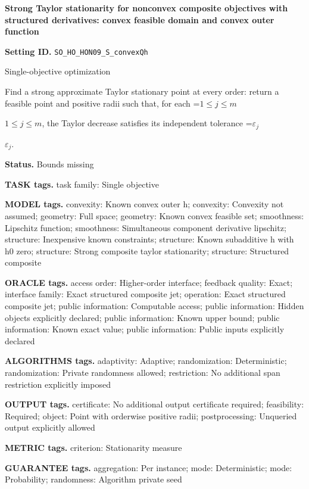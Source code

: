 \documentclass[10pt,a4paper]{article}
\newcommand{\AtlasMath}[1]{\par\begingroup\centering\setbox0=\hbox{$\displaystyle #1$}\ifdim\wd0>1.4\linewidth\typeout{ATLAS WIDE FORMULA: \the\wd0}\fi\ifdim\wd0>\linewidth\resizebox{\linewidth}{!}{\box0}\else\box0\fi\par\endgroup}
\newcommand{\AtlasInlineMath}[1]{\begingroup\setbox0=\hbox{$#1$}\ifdim\wd0>.4\linewidth\endgroup\AtlasMath{#1}\else\endgroup$#1$\fi}
\begin{document}
\raggedright

{\LARGE\bfseries\sffamily\color{AtlasNavy} Strong Taylor stationarity for nonconvex composite objectives with structured derivatives: convex feasible domain and convex outer function\par}\vspace{5pt}
\textbf{Setting ID.} \texttt{SO\_\allowbreak{}HO\_\allowbreak{}HON09\_\allowbreak{}S\_\allowbreak{}convexQh}

Single-objective optimization

Find a strong approximate Taylor stationary point at every order: return a feasible point and positive radii such that, for each \AtlasInlineMath{1\le j\le m}, the Taylor decrease satisfies its independent tolerance \AtlasInlineMath{\varepsilon_j}.

\textbf{Status.} Bounds missing

\textbf{TASK tags.} task family: Single objective

\textbf{MODEL tags.} convexity: Known convex outer h; convexity: Convexity not assumed; geometry: Full space; geometry: Known convex feasible set; smoothness: Lipschitz function; smoothness: Simultaneous component derivative lipschitz; structure: Inexpensive known constraints; structure: Known subadditive h with h0 zero; structure: Strong composite taylor stationarity; structure: Structured composite

\textbf{ORACLE tags.} access order: Higher-order interface; feedback quality: Exact; interface family: Exact structured composite jet; operation: Exact structured composite jet; public information: Computable access; public information: Hidden objects explicitly declared; public information: Known upper bound; public information: Known exact value; public information: Public inputs explicitly declared

\textbf{ALGORITHMS tags.} adaptivity: Adaptive; randomization: Deterministic; randomization: Private randomness allowed; restriction: No additional span restriction explicitly imposed

\textbf{OUTPUT tags.} certificate: No additional output certificate required; feasibility: Required; object: Point with orderwise positive radii; postprocessing: Unqueried output explicitly allowed

\textbf{METRIC tags.} criterion: Stationarity measure

\textbf{GUARANTEE tags.} aggregation: Per instance; mode: Deterministic; mode: Probability; randomness: Algorithm private seed
\end{document}
